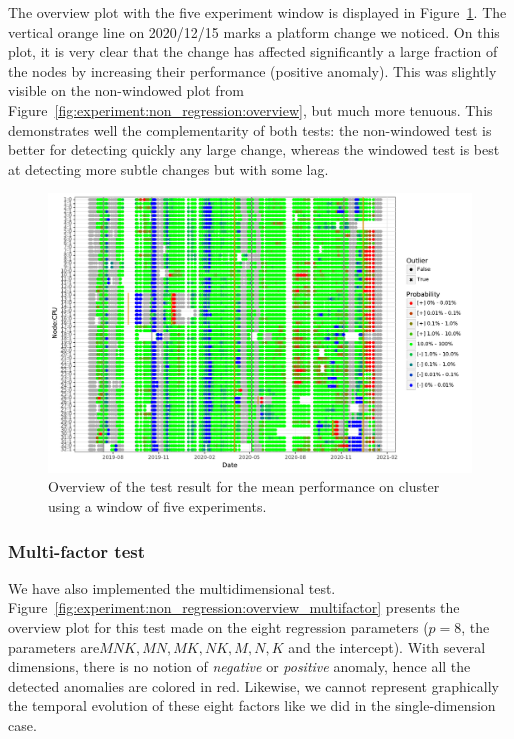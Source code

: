                 The overview plot with the five experiment window is displayed in
                Figure~\ref{fig:experiment:non_regression:overview_windowed}. The vertical orange line on 2020/12/15
                marks a platform change we noticed. On this plot, it is very clear that the change has affected
                significantly a large fraction of the nodes by increasing their performance (positive anomaly). This was
                slightly visible on the non-windowed plot from Figure~\ref{fig:experiment:non_regression:overview}, but
                much more tenuous. This demonstrates well the complementarity of both tests: the non-windowed test is
                better for detecting quickly any large change, whereas the windowed test is best at detecting more
                subtle changes but with some lag.

                \begin{figure}[htpb]
                    \centering
                    \includegraphics[width=\linewidth]{img/experiment/non_regression/implementation/overview_windowed.pdf}
                    \caption{Overview of the test result for the mean performance on cluster \dahu using a window
                    of five experiments.}%
                    \label{fig:experiment:non_regression:overview_windowed}
                \end{figure}

            \subsubsection{Multi-factor test}%

                We have also implemented the multidimensional test.
                Figure~\ref{fig:experiment:non_regression:overview_multifactor} presents the overview plot for this test
                made on the eight regression parameters (\ie \(p=8\), the parameters are\(MNK, MN, MK, NK, M, N, K\) and
                the intercept). With several dimensions, there is no notion of \emph{negative} or \emph{positive}
                anomaly, hence all the detected anomalies are colored in red. Likewise, we cannot represent graphically
                the temporal evolution of these eight factors like we did in the single-dimension case.

